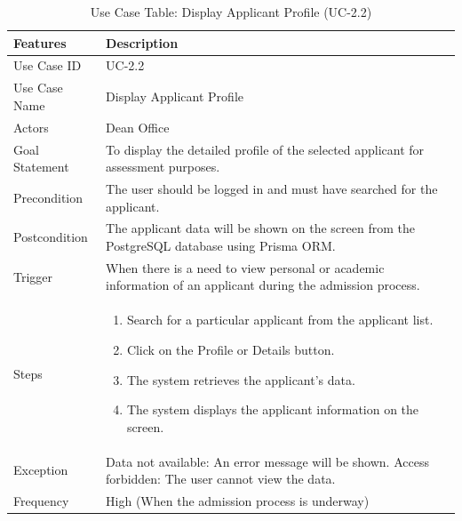 \begin{table}[H] %
    \centering
    \small
    \renewcommand{\arraystretch}{1.4}
    \caption{Use Case Table: Display Applicant Profile (UC-2.2)}
    \label{tab:dean_profile}
    
    \begin{tabularx}{\textwidth}{|l|X|}
        \hline
        \rowcolor[gray]{0.9} {Features} & {Description} \\ \hline
        Use Case ID & UC-2.2 \\ \hline
        Use Case Name & Display Applicant Profile \\ \hline
        Actors & Dean Office \\ \hline
        Goal Statement & To display the detailed profile of the selected applicant for assessment purposes. \\ \hline
        Precondition & The user should be logged in and must have searched for the applicant. \\ \hline
        Postcondition & The applicant data will be shown on the screen from the PostgreSQL database using Prisma ORM. \\ \hline
        Trigger & When there is a need to view personal or academic information of an applicant during the admission process. \\ \hline
        Steps & 
        \begin{enumerate}[nosep, leftmargin=*]
            \item Search for a particular applicant from the applicant list.
            \item Click on the {Profile} or {Details} button.
            \item The system retrieves the applicant’s data.
            \item The system displays the applicant information on the screen.
        \end{enumerate} \\ \hline
        Exception & Data not available: An error message will be shown. Access forbidden: The user cannot view the data. \\ \hline
        Frequency & High (When the admission process is underway) \\ \hline
    \end{tabularx}
\end{table}
